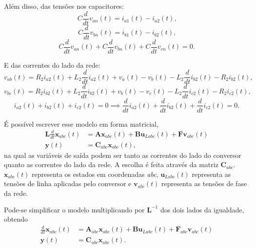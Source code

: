  Além disso, das tensões nos capacitores:
  \begin{equation}
    C \frac{d}{dt} v_{an}(t) = i_{a1}(t) - i_{a2}(t) \text{,}
  \end{equation}
  \begin{equation}
    C \frac{d}{dt} v_{bn}(t) = i_{b1}(t) - i_{b2}(t) \text{,}
  \end{equation}
  \begin{equation}
    C \frac{d}{dt} v_{an}(t) + C \frac{d}{dt} v_{bn}(t) +
      C \frac{d}{dt} v_{cn}(t) = 0 \text{.}
  \end{equation}

  E das correntes do lado da rede:
  \begin{equation}
    v_{ab}(t) = R_2 i_{a2}(t) + L_2 \frac{d}{dt} i_{a2}(t) + v_a(t) - v_b(t)
      - L_2 \frac{d}{dt} i_{b2}(t) - R_2 i_{b2}(t) \text{,}
  \end{equation}
  \begin{equation}
    v_{bc}(t) = R_2 i_{b2}(t) + L_2 \frac{d}{dt} i_{b2}(t) + v_b(t) - v_c(t)
      - L_2 \frac{d}{dt} i_{c2}(t) - R_2 i_{c2}(t) \text{,}
  \end{equation}
  \begin{equation}
    i_{a2}(t) + i_{b2}(t) + i_{c2}(t) = 0 \implies \frac{d}{dt} i_{a2}(t) +
      \frac{d}{dt} i_{b2}(t) + \frac{d}{dt} i_{c2}(t) = 0 \text{.}
  \end{equation}

  É possível escrever esse modelo em forma matricial,
  \begin{equation}
    \begin{split}
      \mathbf{L} \frac{d}{dt} \mathbf{x}_{abc}(t) & = \mathbf{Ax}_{abc}(t) +
          \mathbf{Bu}_{Labc}(t) + \mathbf{Fv}_{abc}(t) \\
      \mathbf{y}(t) & = \mathbf{C}_{abc} \mathbf{x}_{abc}(t) \text{,}
    \end{split}
  \end{equation}
  na qual as variáveis de saída podem ser tanto as correntes do lado do conversor quanto as correntes do lado da rede. A escolha é feita através da matriz $\mathbf{C}_{abc}$. $\mathbf{x}_{abc}(t)$ representa os estados em coordenadas \emph{abc}, $\mathbf{u}_{Labc}(t)$ representa as tensões de linha aplicadas pelo conversor e $\mathbf{v}_{abc}(t)$ representa as tensões de fase da rede.

  Pode-se simplificar o modelo multiplicando por $\mathbf{L}^{-1}$ dos dois lados da igualdade, obtendo
  \begin{equation}
    \begin{split}
      \frac{d}{dt} \mathbf{x}_{abc}(t) & = \mathbf{A}_{abc} \mathbf{x}_{abc}(t) +
        \mathbf{Bu}_{Labc}(t) + \mathbf{F}_{abc} \mathbf{v}_{abc}(t) \\
        \mathbf{y}(t) & = \mathbf{C}_{abc} \mathbf{x}_{abc}(t) \text{.}
    \end{split}
  \end{equation}

